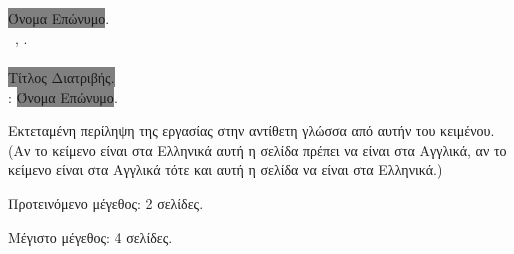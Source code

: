 \chapter*{\cseextabstract}
\addstarredchapter{\cseextabstract} %
\makeatletter

\colorbox{gray}{Όνομα Επώνυμο}.\\
\cseextabstracttype\ \cseextabstractcs, \@date.\\
\cseextabstractdpt\\
\colorbox{gray}{Τίτλος Διατριβής.}\\
\cseextabstractsup: \colorbox{gray}{Όνομα Επώνυμο}.\\
\bigskip

\noindent Εκτεταμένη περίληψη της εργασίας στην αντίθετη
γλώσσα από αυτήν του κειμένου. (Αν το κείμενο είναι στα
Ελληνικά αυτή η σελίδα πρέπει να είναι στα Αγγλικά, αν
το κείμενο είναι στα Αγγλικά τότε και αυτή η σελίδα να
είναι στα Ελληνικά.)

\y\noindent Προτεινόμενο μέγεθος: 2 σελίδες.

\y\noindent Μέγιστο μέγεθος: 4 σελίδες.